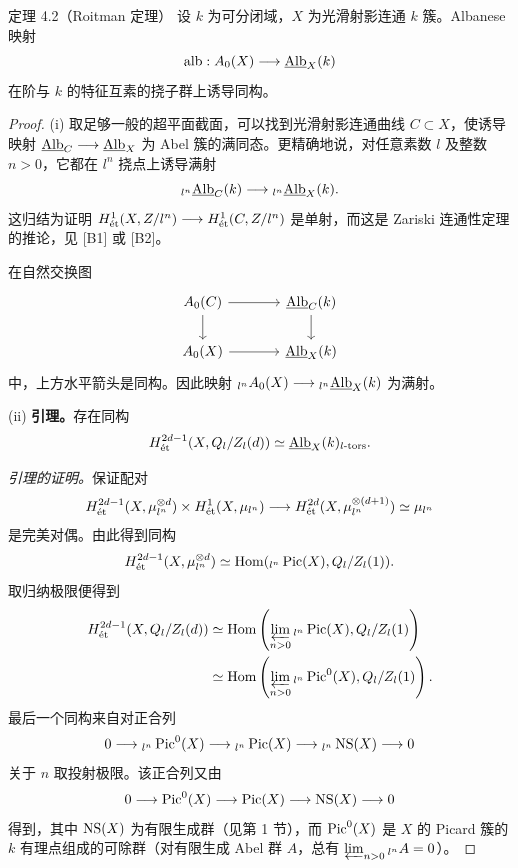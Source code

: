 \begin{statement}{定理 4.2（Roitman 定理）}
设 $k$ 为可分闭域，$X$ 为光滑射影连通 $k$ 簇。Albanese 映射
\[
\operatorname{alb}:A_0(X)\longrightarrow\underline{\operatorname{Alb}}_X(k)
\]
在阶与 $k$ 的特征互素的挠子群上诱导同构。
\end{statement}
\begin{proof}
(i) 取足够一般的超平面截面，可以找到光滑射影连通曲线 $C\subset X$，使诱导映射 $\underline{\operatorname{Alb}}_C\longrightarrow\underline{\operatorname{Alb}}_X$ 为 Abel 簇的满同态。更精确地说，对任意素数 $l$ 及整数 $n>0$，它都在 $l^n$ 挠点上诱导满射
\[
{}_{l^n}\underline{\operatorname{Alb}}_C(k)\longrightarrow{}_{l^n}\underline{\operatorname{Alb}}_X(k).
\]
这归结为证明 $H^1_{\mathrm{\acute et}}(X,Z/l^n)\longrightarrow H^1_{\mathrm{\acute et}}(C,Z/l^n)$ 是单射，而这是 Zariski 连通性定理的推论，见 [B1] 或 [B2]。

在自然交换图
\[
\begin{tikzcd}[ampersand replacement=\&,column sep=large]
A_0(C) \arrow[r] \arrow[d] \& \underline{\Alb}_C(k) \arrow[d]\\
A_0(X) \arrow[r] \& \underline{\Alb}_X(k)
\end{tikzcd}
\]
中，上方水平箭头是同构。因此映射 ${}_{l^n}A_0(X)\longrightarrow{}_{l^n}\underline{\operatorname{Alb}}_X(k)$ 为满射。

(ii) \textbf{引理。}存在同构
\[
H^{2d-1}_{\mathrm{\acute et}}(X,Q_l/Z_l(d))\simeq\underline{\operatorname{Alb}}_X(k)_{l\text{-}\mathrm{tors}}.
\]

\textit{引理的证明。}保证配对
\[
H^{2d-1}_{\mathrm{\acute et}}(X,\mu_{l^n}^{\otimes d})\times H^1_{\mathrm{\acute et}}(X,\mu_{l^n})\longrightarrow H^{2d}_{\mathrm{\acute et}}(X,\mu_{l^n}^{\otimes(d+1)})\simeq\mu_{l^n}
\]
是完美对偶。由此得到同构
\[
H^{2d-1}_{\mathrm{\acute et}}(X,\mu_{l^n}^{\otimes d})\simeq\operatorname{Hom}({}_{l^n}\operatorname{Pic}(X),Q_l/Z_l(1)).
\]
取归纳极限便得到
\[
\begin{aligned}
H^{2d-1}_{\mathrm{\acute et}}(X,Q_l/Z_l(d))
&\simeq\operatorname{Hom}\left(\varprojlim_{n>0}{}_{l^n}\operatorname{Pic}(X),Q_l/Z_l(1)\right)\\
&\simeq\operatorname{Hom}\left(\varprojlim_{n>0}{}_{l^n}\operatorname{Pic}^0(X),Q_l/Z_l(1)\right).
\end{aligned}
\]
最后一个同构来自对正合列
\[
0\longrightarrow{}_{l^n}\operatorname{Pic}^0(X)\longrightarrow{}_{l^n}\operatorname{Pic}(X)\longrightarrow{}_{l^n}\operatorname{NS}(X)\longrightarrow0
\]
关于 $n$ 取投射极限。该正合列又由
\[
0\longrightarrow\operatorname{Pic}^0(X)\longrightarrow\operatorname{Pic}(X)\longrightarrow\operatorname{NS}(X)\longrightarrow0
\]
得到，其中 $\operatorname{NS}(X)$ 为有限生成群（见第 1 节），而 $\operatorname{Pic}^0(X)$ 是 $X$ 的 Picard 簇的 $k$ 有理点组成的可除群（对有限生成 Abel 群 $A$，总有 $\varprojlim_{n>0}{}_{l^n}A=0$）。


\end{proof}
